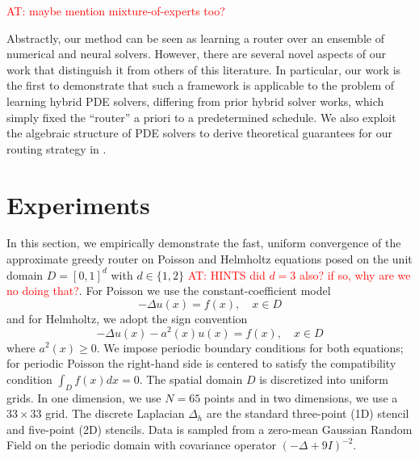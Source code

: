 \documentclass{article} %
\newcommand\ambuj[1]{\textcolor{red}{AT: #1}}
\begin{document}
\ambuj{maybe mention mixture-of-experts too?}

Abstractly, our method can be seen as learning a router over an ensemble of numerical and neural solvers. However, there are several novel aspects of our work that distinguish it from others of this literature. In particular, our work is the first to demonstrate that such a framework is applicable to the problem of learning hybrid PDE solvers, differing from prior hybrid solver works, which simply fixed the ``router'' a priori to a predetermined schedule. We also exploit the algebraic structure of PDE solvers to derive theoretical guarantees for our routing strategy in .

\section{Experiments}\label{sec:experiments}

In this section, we empirically demonstrate the fast, uniform convergence of the approximate greedy router on Poisson and Helmholtz equations posed on the unit domain $D = [0, 1]^d$ with $d\in \{1, 2\}$ \ambuj{HINTS did $d=3$ also? if so, why are we no doing that?}. For Poisson we use the constant-coefficient model
$$- \Delta u(x) = f(x), \quad x\in D$$ and for Helmholtz, we adopt the sign convention 
$$-\Delta u(x) - a^2(x)u(x) = f(x), \quad x\in D$$ where $a^2(x) \geq 0$. We impose periodic boundary conditions for both equations; for periodic Poisson the right-hand side is centered to satisfy the compatibility condition $\int_D f(x)dx = 0$. The spatial domain $D$ is discretized into uniform grids. In one dimension, we use $N = 65$ points and in two dimensions, we use a $33 \times 33$ grid. The discrete Laplacian $\Delta_h$ are the standard three-point (1D) 
stencil and five-point (2D) 
stencils. Data is sampled from a zero-mean Gaussian Random Field on the periodic domain with covariance operator $(- \Delta + 9I)^{-2}$. 
%  
\end{document}
